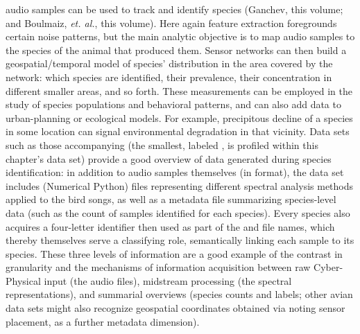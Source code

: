 {\begin{description}
audio samples can be used to track and identify 
species (Ganchev, this volume; and Boulmaiz, \textit{et. al.},
this volume).  Here again feature 
extraction foregrounds certain noise patterns, but the 
main analytic objective is to map audio samples to 
the species of the animal that produced them.  
Sensor networks can then build a geospatial/temporal 
model of species' distribution in the area covered by 
the network: which species are identified, their prevalence, 
their concentration in different smaller areas, and so forth.  
These measurements can be employed in the study of 
species populations and behavioral patterns, and can 
also add data to urban-planning or ecological models.  
For example, precipitous decline of a species in some 
location can signal environmental degradation in that vicinity.   
\pseudoIndent{}
Data sets such as those accompanying \cite{JustinSalamon} 
(the smallest, labeled \CLOds{}, is profiled within
this chapter's data set)   
provide a good overview of data generated during 
species identification: in addition to audio 
samples themselves (in \WAV{} format), the data set 
includes \NPY{} (Numerical Python) files representing 
different spectral analysis methods applied 
to the bird songs, as well as a metadata file 
summarizing species-level data (such as the count 
of samples identified for each species).  
Every species also acquires a four-letter identifier then used
as part of the \WAV{} and \NPY{} file names, which thereby 
themselves serve a classifying role, 
semantically linking each sample to its species.  
These three levels of information are a good 
example of the contrast in granularity 
\mdash{} and the mechanisms of information acquisition 
\mdash{} between raw Cyber-Physical input (the audio files), midstream 
processing (the spectral representations), and 
summarial overviews (species counts and labels;   
other avian data sets might also recognize 
geospatial coordinates obtained via noting sensor placement, 
as a further metadata dimension).
 

\end{description}}
